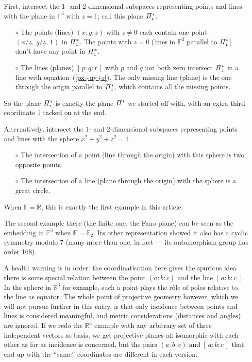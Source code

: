 \documentclass[12pt]{article}
\def\comma{,\,\allowbreak}
\def\Rset{\mathbb{R}}
\def\Fset{\mathbb{F}}
\begin{document}
First, intersect the 1- and 2-dimensional subspaces representing {\sc point}s and
{\sc line}s with the plane in $\Fset^3$ with $z=1$; call this plane $\mit\Pi^*_1$.
%
\begin{itemize}

\item[$\circ$] The {\sc point}s (lines) $(x:y:z)$ with $z\ne 0$ each contain one
               point $(x/z\comma y/z\comma 1)$ in $\mit\Pi^*_1$. The {\sc point}s
               with $z=0$ (lines in $\Fset^3$ parallel to $\mit\Pi^*_1$)
               don't have any point in $\mit\Pi^*_1$.

\item[$\circ$] The {\sc line}s (planes) $[\,p:q:r\,]$ with $p$ and $q$ not both zero
               intersect $\mit\Pi^*_1$ in a line with equation~(\ref{px+qy+r}).
               The only missing {\sc line} (plane) is the one through the origin
               parallel to $\mit\Pi^*_1$, which contains all the missing {\sc point}s.

\end{itemize}
%
So the plane $\mit\Pi^*_1$ is exactly the plane $\mit\Pi^*$ we started off
with, with an extra third coordinate 1 tacked on at the end.

Alternatively, intersect the 1- and 2-dimensional subspaces representing
{\sc point}s and {\sc line}s with the sphere $x^2+y^2+z^2=1$.
%
\begin{itemize}

\item[$\circ$] The intersection of a {\sc point} (line through the origin) with this
               sphere is two opposite points.

\item[$\circ$] The intersection of a {\sc line} (plane through the origin) with the
               sphere is a great circle.

\end{itemize}
%
When $\Fset=\Rset$, this is exactly the first example in this article.

The second example there (the finite one, the Fano plane) can be seen as
the embedding in $\Fset^3$ when $\Fset=\Fset_2$. Its other representation
showed it also has a cyclic symmetry modulo 7 (many more than one, in fact
--- its automorphism group has order 168).

A health warning is in order: the coordinatisation here gives the
spurious idea there is some special relation between the {\sc point} $(a:b:c)$
and the {\sc line} $[\,a:b:c\,]$. In the sphere in $\Rset^3$ for example, such
a {\sc point} plays the r\^ole of poles relative to the {\sc line} as equator. The whole
point of projective geometry however, which we will not pursue further in
this entry, is that only incidence between {\sc point}s and {\sc line}s is considered
meaningful, and metric considerations (distances and angles) are ignored.
If we redo the $\Rset^3$ example with any arbitrary set of three independent
vectors as basis, we get projective planes all isomorphic with each other as far as
incidence is concerned, but the pairs $(a:b:c)$ and $[\,a:b:c\,]$ that
end up with the ``same'' coordinates are different in each version.
\end{document}
